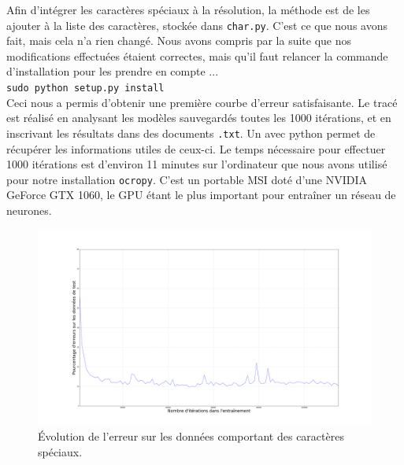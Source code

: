 \documentclass{article}
\begin{document}
Afin d'intégrer les caractères spéciaux à la résolution, la méthode est de les ajouter à la liste des caractères, stockée dans \texttt{char.py}. C'est ce que nous avons fait, mais cela n'a rien changé. Nous avons compris par la suite que nos modifications effectuées étaient correctes, mais qu'il faut relancer la commande d'installation pour les prendre en compte ... \\
\texttt{sudo python setup.py install} \\

Ceci nous a permis d'obtenir une première courbe d'erreur satisfaisante. Le tracé est réalisé en analysant les modèles sauvegardés toutes les 1000 itérations, et en inscrivant les résultats dans des documents \texttt{.txt}. Un  avec python permet de récupérer les informations utiles de ceux-ci. 
Le temps nécessaire pour effectuer 1000 itérations est d'environ 11 minutes sur l'ordinateur que nous avons utilisé pour notre installation \texttt{ocropy}. C'est un portable MSI doté d'une NVIDIA GeForce GTX 1060, le GPU étant le plus important pour entraîner un réseau de neurones.

\begin{figure}[!h] 
	\center
	\includegraphics[width=13cm]{error_default.png}
	\caption{Évolution de l'erreur sur les données comportant des caractères spéciaux.}
	\label{err_default}
\end{figure}
\end{document}
